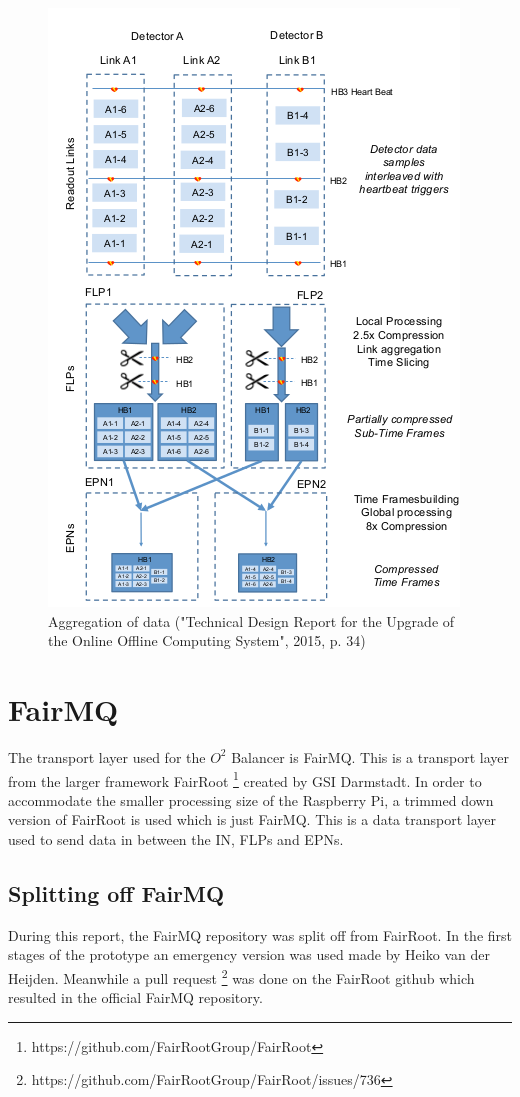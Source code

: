 \begin{figure}
	\centering
	\includegraphics[scale=1]{./graphics/data_aggregation.png}
	\caption{Aggregation of data ("Technical Design Report for the Upgrade of the Online Offline Computing System", 2015, p. 34)}
\end{figure}

\section{FairMQ}
The transport layer used for the $O^2$ Balancer is FairMQ. This is a transport layer from the larger framework FairRoot \footnote{https://github.com/FairRootGroup/FairRoot} created by GSI Darmstadt. In order to accommodate the smaller processing size of the Raspberry Pi, a trimmed down version of FairRoot is used which is just FairMQ. This is a data transport layer used to send data in between the IN, FLPs and EPNs. 
\subsection{Splitting off FairMQ}
During this report, the FairMQ repository was split off from FairRoot. In the first stages of the prototype an emergency version was used made by Heiko van der Heijden. Meanwhile a pull request 
\footnote{https://github.com/FairRootGroup/FairRoot/issues/736} was done on the FairRoot github which resulted in the official FairMQ repository.

